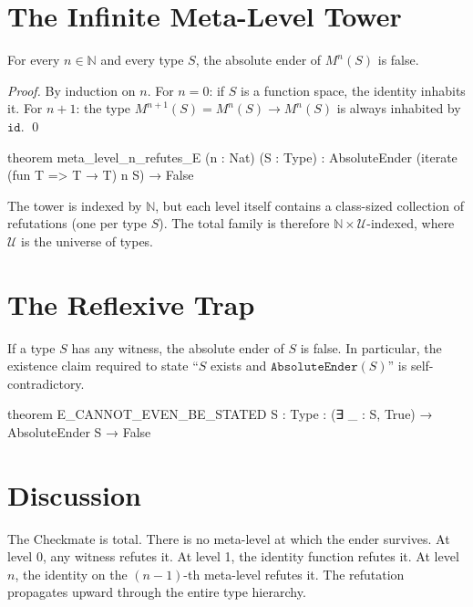 \section{The Infinite Meta-Level Tower}

\begin{theorem}\label{thm:meta-n}
For every $n \in \mathbb{N}$ and every type $S$, the absolute ender of $M^n(S)$ is false.
\end{theorem}

\begin{proof}
By induction on $n$. For $n = 0$: if $S$ is a function space, the identity inhabits it. For $n + 1$: the type $M^{n+1}(S) = M^n(S) \to M^n(S)$ is always inhabited by $\texttt{id}$. \qed
\end{proof}

\begin{leancode}
theorem meta_level_n_refutes_E (n : Nat) (S : Type) :
    AbsoluteEnder (iterate (fun T => T → T) n S) → False
\end{leancode}

\begin{remark}
The tower is indexed by $\mathbb{N}$, but each level itself contains a class-sized collection of refutations (one per type $S$). The total family is therefore $\mathbb{N} \times \mathcal{U}$-indexed, where $\mathcal{U}$ is the universe of types.
\end{remark}

\section{The Reflexive Trap}

\begin{theorem}\label{thm:cannot-state}
If a type $S$ has any witness, the absolute ender of $S$ is false. In particular, the existence claim required to state ``$S$ exists and $\texttt{AbsoluteEnder}(S)$'' is self-contradictory.
\end{theorem}

\begin{leancode}
theorem E_CANNOT_EVEN_BE_STATED {S : Type} :
    (∃ _ : S, True) → AbsoluteEnder S → False
\end{leancode}

\section{Discussion}

The Checkmate is total. There is no meta-level at which the ender survives. At level 0, any witness refutes it. At level 1, the identity function refutes it. At level $n$, the identity on the $(n{-}1)$-th meta-level refutes it. The refutation propagates upward through the entire type hierarchy.

